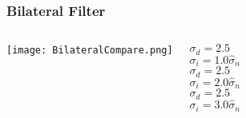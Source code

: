 \documentclass{beamer}
\begin{document}
\begin{frame}
\begin{center}
\frametitle{Bilateral Filter}

\begin{columns}


\texttt{[image: BilateralCompare.png]}


\justifying

$\sigma_d = 2.5$\\

$\sigma_i = 1.0 \hat{\sigma}_n$\\

$ $\\

$ $\\

$ $\\

$\sigma_d = 2.5$\\

$\sigma_i = 2.0 \hat{\sigma}_n$\\

$ $\\

$ $\\

$ $\\

$\sigma_d = 2.5$\\

$\sigma_i = 3.0 \hat{\sigma}_n$

\end{columns}

\end{center}
\end{frame}

\end{document}
